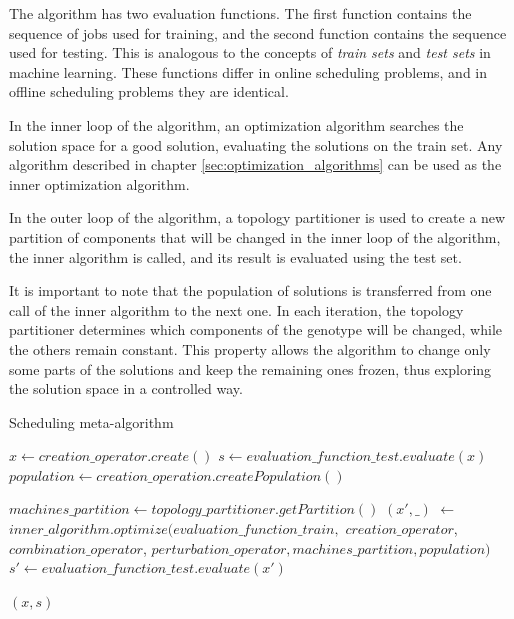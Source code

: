 The algorithm has two evaluation functions. The first function contains the sequence of jobs used for training, and the second function contains the sequence used for testing. This is analogous to the concepts of \textit{train sets} and \textit{test sets} in machine learning. These functions differ in online scheduling problems, and in offline scheduling problems they are identical.

In the inner loop of the algorithm, an optimization algorithm searches the solution space for a good solution, evaluating the solutions on the train set. Any algorithm described in chapter \ref{sec:optimization_algorithms} can be used as the inner optimization algorithm.

In the outer loop of the algorithm, a topology partitioner is used to create a new partition of components that will be changed in the inner loop of the algorithm, the inner algorithm is called, and its result is evaluated using the test set. 

It is important to note that the population of solutions is transferred from one call of the inner algorithm to the next one. In each iteration, the topology partitioner determines which components of the genotype will be changed, while the others remain constant. This property allows the algorithm  to change only some parts of the solutions and keep the remaining ones frozen, thus exploring the solution space in a controlled way.

\begin{algorithm}[!htbp]
    \caption{Scheduling meta-algorithm}
    \label{alg:sma}

    $x \gets creation\_operator.create()$\;
    $s \gets evaluation\_function\_test.evaluate(x)$\;
    $population \gets creation\_operation.createPopulation()$\;

     {

        $machines\_partition \gets topology\_partitioner.getPartition()$\;
        $(x', \_)$ $\gets$ $inner\_algorithm.optimize($$evaluation\_function\_train,$ \newline \hspace*{1em} $creation\_operator$, $combination\_operator$,  $perturbation\_operator,$\newline \hspace*{1em}$ machines\_partition, population)$\;
        $s' \gets evaluation\_function\_test.evaluate(x')$\;
    }

    \Return $(x, s)$\;
    \end{algorithm}

